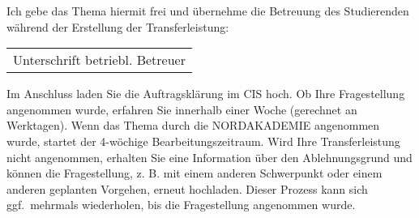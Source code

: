 \documentclass[12pt]{article}
\begin{document}
\vspace{1.5em}


\vspace{1.5em}


\vspace{1.5em}


\newpage

\vspace*{1.5em}

Ich gebe das Thema hiermit frei und übernehme die Betreuung des Studierenden während
der Erstellung der Transferleistung:

\vspace{1.5em}

\renewcommand{\arraystretch}{1.5} %

\begin{tabularx}{.4\textwidth}{X}
    \\
    \hline
    Unterschrift betriebl. Betreuer \\
\end{tabularx}

\vspace{3em}

Im Anschluss laden Sie die
Auftragsklärung im CIS hoch. Ob Ihre Fragestellung angenommen wurde, erfahren Sie innerhalb einer Woche (gerechnet an Werktagen). Wenn das Thema durch die NORDAKADEMIE angenommen wurde, startet der 4-wöchige
Bearbeitungszeitraum. Wird Ihre Transferleistung nicht angenommen, erhalten Sie eine
Information über den Ablehnungsgrund und können die Fragestellung, z. B. mit einem
anderen Schwerpunkt oder einem anderen geplanten Vorgehen, erneut hochladen.
Dieser Prozess kann sich ggf.\ mehrmals wiederholen, bis die Fragestellung angenommen
wurde.
\end{document}

